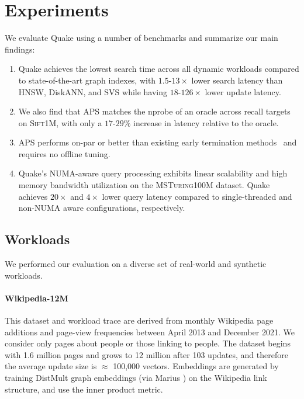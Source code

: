 \section{Experiments}
\label{sec:experiments}

We evaluate Quake using a number of benchmarks and summarize our main findings:

\begin{enumerate}[leftmargin=*, itemsep=-1pt, topsep=0pt]
    \item Quake achieves the lowest search time across all dynamic workloads compared to state-of-the-art graph indexes, with $1.5$-$13\times$ lower search latency than HNSW, DiskANN, and SVS while having $18$-$126\times$ lower update latency.
    \item We also find that APS matches the nprobe of an oracle across recall targets on \textsc{Sift1M}, with only a $17$-$29\%$ increase in latency relative to the oracle. 
    \item APS performs on-par or better than existing early termination methods~\cite{zhang2023fast, chen_spann_nodate, li2020improving} and requires no offline tuning. %
    \item Quake's NUMA-aware query processing exhibits linear scalability and high memory bandwidth utilization on the \textsc{MSTuring100M} dataset. Quake achieves $20\times$ and $4\times$ lower query latency compared to single-threaded and non-NUMA aware configurations, respectively.%
\end{enumerate}

\subsection{Workloads}

We performed our evaluation on a diverse set of real-world and synthetic workloads.

\paragraph{Wikipedia-12M} 
This dataset and workload trace are derived from monthly Wikipedia page additions and page-view \cite{wiki} frequencies between April 2013 and December 2021. We consider only pages about people or those linking to people. The dataset begins with 1.6 million pages and grows to 12 million after 103 updates, and therefore the average update size is $\approx$ 100,000 vectors. Embeddings are generated by training DistMult \cite{distmult} graph embeddings (via Marius \cite{mohoney2021marius, waleffe2023mariusgnn}) on the Wikipedia link structure, and use the inner product metric.

